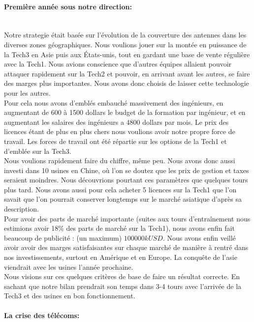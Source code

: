 \paragraph{Première année sous notre direction:}~\\
Notre strategie était basée sur l'évolution de la couverture des
antennes dans les diverses zones géographiques. Nous voulions jouer
sur la montée en puissance de la Tech3 en Asie puis aux États-unis,
tout en gardant une base de vente régulière avec la Tech1. Nous
avions conscience que d'autres équipes allaient pouvoir attaquer 
rapidement sur la Tech2 et pouvoir, en arrivant avant les autres,
se faire des marges plus importantes. Nous avons donc choisis de 
laisser cette technologie pour les autres.\\

Pour cela nous avons d'emblés embauché massivement des ingénieurs, 
en augmentant de 600 à 1500 dollars le budget de la formation par 
ingénieur, et en augmentant les salaires des ingénieurs a 4800
dollars par mois. Le prix des licences étant de plus en plus chers
nous voulions avoir notre propre force de travail.
Les forces de travail ont été répartie sur les options de la Tech1
et d'emblée sur la Tech3.\\

Nous voulions rapidement faire du chiffre, même peu. Nous avons donc 
aussi investi dans 10 usines en Chine, où l'on se doutez que les prix 
de gestion et taxes seraient moindres. Nous découvrions pourtant
ces paramètres que quelques tours plus tard. Nous avons aussi pour cela
acheter 5 licences sur la Tech1 que l'on savait que l'on pourrait 
conserver longtemps sur le marché asiatique d'après sa description.\\
 
Pour avoir des parts de marché importante (suites aux tours d'entraînement
nous estimions avoir 18\% des parts de marché sur la Tech1), nous
avons enfin fait beaucoup de publicité : (un maximum) $100 000 kUSD$.
Nous avons enfin veillé avoir avoir des marges satisfaisantes sur chaque
marché de manière à rentré dans nos investissements, surtout en Amérique
et en Europe. La conquête de l'asie viendrait avec les usines l'année 
prochaine.\\

Nous visions sur ces quelques critères de base de faire un résultat
correcte. En sachant que notre bilan prendrait son temps dans 3-4 tours
avec l'arrivée de la Tech3 et des usines en bon fonctionnement.


\paragraph{La crise des télécoms:}~\\

